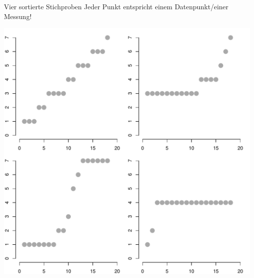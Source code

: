 \begin{frame}
  {Vier sortierte Stichproben}
  Jeder Punkt entspricht einem Datenpunkt\slash einer Messung!\\
  \begin{center}
    \includegraphics[height=0.75\textheight]{RVorlesung/foursamples}
  \end{center}
\end{frame}

